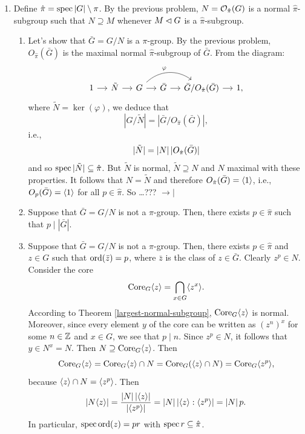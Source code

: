 \begin{solution}
\begin{enumerate}[\upshape a)]
    \item Define $\hat\pi=\operatorname{spec}\left\vert{G}\right\vert\setminus\pi$. By the previous problem, $N={\cal O}_{\hat\pi}(G)$ is a normal $\hat\pi$-subgroup such that $N\supseteq M$ whenever $M\lhd G$ is a $\hat\pi$-subgroup.

    \begin{enumerate}[$\to\!\!|$]
        \item Let's show that $\bar G=G/N$ is a $\pi$-group. By the previous problem, $O_{\hat\pi}(\bar G)$ is the maximal normal $\hat\pi$-subgroup of $\bar G$. From the diagram:
        $$
            \begin{tikzcd}[column sep=small]
                1\arrow[r]&\tilde N\arrow[r]
                    &G\vphantom/\arrow[rr,"\varphi",bend left=40]\arrow[r]
                    &\bar G\arrow[r]
                    &\bar G/O_{\hat\pi}(\bar G)\arrow[r]
                    &1,
            \end{tikzcd}
        $$
        where $\tilde N=\ker(\varphi)$, we deduce that
        $$
            |G/\tilde N|=|\bar G/O_{\hat\pi}(\bar G)|,
        $$
        i.e.,
        $$
            |\tilde N|=\left\vert{N}\right\vert|O_{\hat\pi}(\bar G)|
        $$
        and so $\operatorname{spec}|\tilde N|\subseteq\hat\pi$. But $\tilde N$ is normal, $\tilde N\supseteq N$ and $N$ maximal with these properties. It follows that $N=\tilde N$ and therefore $O_{\hat\pi}(\bar G)=\langle1\rangle$, i.e., $O_p(\bar G)=\langle1\rangle$ for all $p\in\hat\pi$. So \dots??? $\to\!\!|$

        \item Suppose that $\bar G=G/N$ is not a $\pi$-group. Then, there exists $p\in\hat\pi$ such that $p\mid|\bar G|$. 

        \item Suppose that $\bar G=G/N$ is not a $\pi$-group. Then, there exists $p\in\hat\pi$ and $z\in G$ such that ${\rm ord}(\bar z)=p$, where $\bar z$ is the class of $z\in\bar G$. Clearly $z^p\in N$. Consider the core
        $$
            {\rm Core}_G\langle z\rangle = \bigcap_{x\in G}\langle z^x\rangle.
        $$
        According to Theorem \ref{largest-normal-subgroup}, ${\rm Core}_G\langle z\rangle$ is normal. Moreover, since every element $y$ of the core can be written as $(z^n)^x$ for some $n\in\mathbb{Z}$ and $x\in G$, we see that $p\mid n$. Since $z^p\in N$, it follows that $y\in N^x=N$. Then $N\supseteq{\rm Core}_G\langle z\rangle$. Then
        $$
            {\rm Core}_G\langle z\rangle={\rm Core}_G\langle z\rangle\cap N={\rm Core}_G(\langle z\rangle\cap N)={\rm Core}_G\langle z^p\rangle,
        $$
        because $\langle z\rangle\cap N=\langle z^p\rangle$. Then
        $$
            \left\vert{N\langle z\rangle}\right\vert=\frac{\left\vert{N}\right\vert\left\vert{\langle z\rangle}\right\vert}{|\langle z^p\rangle|}
                =\left\vert{N}\right\vert|\langle z\rangle:\langle z^p\rangle|=\left\vert{N}\right\vert p.
        $$
        In particular, $\operatorname{spec}{\rm ord}(z)=pr$ with $\operatorname{spec}r\subseteq\hat\pi$.
    

\end{enumerate}
\end{enumerate}
\end{solution}
